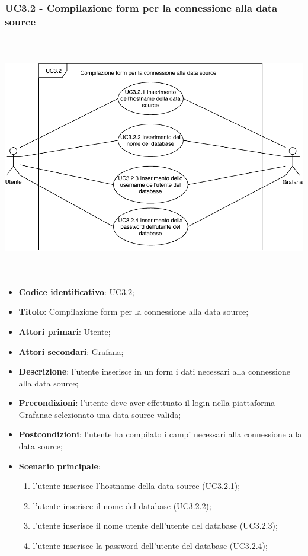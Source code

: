     \subsubsection{UC3.2 - Compilazione form per la connessione alla data source}
    \hspace*{-0.5cm}\includegraphics[width=400pt, height=300pt]{img/uc3_2.pdf}
        \begin{itemize}
            \item \textbf{Codice identificativo}: UC3.2;
            \item \textbf{Titolo}: Compilazione form per la connessione alla data source;
            \item \textbf{Attori primari}: Utente;
            \item \textbf{Attori secondari}: Grafana\glo;
            \item \textbf{Descrizione}: l'utente inserisce in un form i dati necessari alla connessione alla data source;
            \item \textbf{Precondizioni}: l'utente deve aver effettuato il login nella piattaforma Grafana\glosp e selezionato una data source valida;
            \item \textbf{Postcondizioni}: l'utente ha compilato i campi necessari alla connessione alla data source;
            \item \textbf{Scenario principale}:
            \begin{enumerate}
                \item l'utente inserisce l'hostname della data source (UC3.2.1);
                \item l'utente inserisce il nome del database (UC3.2.2);
                \item l'utente inserisce il nome utente dell'utente del database (UC3.2.3);
                \item l'utente inserisce la password dell'utente del database (UC3.2.4);
            \end{enumerate}
        \end{itemize}
